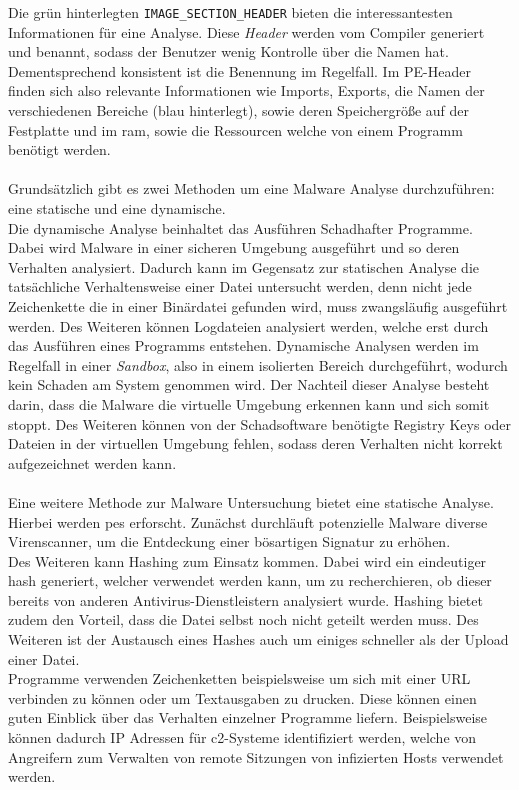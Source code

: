 \documentclass[
    12pt, %
    DIV10,
    ngerman, %
    a4paper, %
    oneside, %
    titlepage, %
    parskip=half, %
    headings=normal, %
    listof=totoc, %
    bibliography=totoc, %
    index=totoc, %
    captions=tableheading, %
    final %
]{scrreprt}
\begin{document}
Die grün hinterlegten \texttt{IMAGE\_SECTION\_HEADER} bieten die interessantesten Informationen für eine Analyse. Diese \emph{Header} werden vom Compiler generiert und benannt, sodass der Benutzer wenig Kontrolle über die Namen hat. Dementsprechend konsistent ist die Benennung im Regelfall. Im PE-Header finden sich also relevante Informationen wie Imports, Exports, die Namen der verschiedenen Bereiche (blau hinterlegt), sowie deren Speichergröße auf der Festplatte und im \ac{ram}, sowie die Ressourcen welche von einem Programm benötigt werden.
\\\\
Grundsätzlich gibt es zwei Methoden um eine Malware Analyse durchzuführen: eine statische und eine dynamische.\\
Die dynamische Analyse beinhaltet das Ausführen Schadhafter Programme. Dabei wird Malware in einer sicheren Umgebung ausgeführt und so deren Verhalten analysiert. Dadurch kann im Gegensatz zur statischen Analyse die tatsächliche Verhaltensweise einer Datei untersucht werden, denn nicht jede Zeichenkette die in einer Binärdatei gefunden wird, muss zwangsläufig ausgeführt werden. Des Weiteren können Logdateien analysiert werden, welche erst durch das Ausführen eines Programms entstehen.
Dynamische Analysen werden im Regelfall in einer \emph{Sandbox}, also in einem isolierten Bereich durchgeführt, wodurch kein Schaden am System genommen wird.
Der Nachteil dieser Analyse besteht darin, dass die Malware die virtuelle Umgebung erkennen kann und sich somit stoppt. Des Weiteren können von der Schadsoftware benötigte Registry Keys oder Dateien in der virtuellen Umgebung fehlen, sodass deren Verhalten nicht korrekt aufgezeichnet werden kann.\\\\
Eine weitere Methode zur Malware Untersuchung bietet eine statische Analyse. Hierbei werden \ac{pes} erforscht. Zunächst durchläuft potenzielle Malware diverse Virenscanner, um die Entdeckung einer bösartigen Signatur zu erhöhen.\\ 
Des Weiteren kann Hashing zum Einsatz kommen. Dabei wird ein eindeutiger hash generiert, welcher verwendet werden kann, um zu recherchieren, ob dieser bereits von anderen Antivirus-Dienstleistern analysiert wurde. Hashing bietet zudem den Vorteil, dass die Datei selbst noch nicht geteilt werden muss. Des Weiteren ist der Austausch eines Hashes auch um einiges schneller als der Upload einer Datei.\\
Programme verwenden Zeichenketten beispielsweise um sich mit einer URL verbinden zu können oder um Textausgaben zu drucken. Diese können einen guten Einblick über das Verhalten einzelner Programme liefern. Beispielsweise können dadurch IP Adressen für \ac{c2}-Systeme identifiziert werden, welche von Angreifern zum Verwalten von remote Sitzungen von infizierten Hosts verwendet werden.\\
\end{document}
